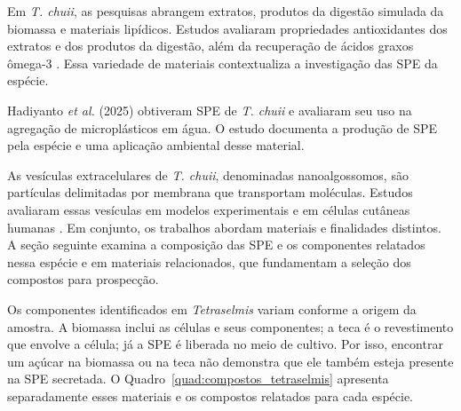 Em \textit{T. chuii}, as pesquisas abrangem extratos, produtos da digestão simulada da biomassa e materiais lipídicos. Estudos avaliaram propriedades antioxidantes dos extratos e dos produtos da digestão, além da recuperação de ácidos graxos ômega-3 \parencite{cokdinleyen2024,moon2023,paterson2024}. Essa variedade de materiais contextualiza a investigação das SPE da espécie.

Hadiyanto \textit{et al.} (2025) obtiveram SPE de \textit{T. chuii} e avaliaram seu uso na agregação de microplásticos em água. O estudo documenta a produção de SPE pela espécie e uma aplicação ambiental desse material.

As vesículas extracelulares de \textit{T. chuii}, denominadas nanoalgossomos, são partículas delimitadas por membrana que transportam moléculas. Estudos avaliaram essas vesículas em modelos experimentais e em células cutâneas humanas \parencite{adamo2024,gargano2026}. Em conjunto, os trabalhos abordam materiais e finalidades distintos. A seção seguinte examina a composição das SPE e os componentes relatados nessa espécie e em materiais relacionados, que fundamentam a seleção dos compostos para prospecção.

Os componentes identificados em \textit{Tetraselmis} variam conforme a origem da amostra. A biomassa inclui as células e seus componentes; a teca é o revestimento que envolve a célula; já a SPE é liberada no meio de cultivo. Por isso, encontrar um açúcar na biomassa ou na teca não demonstra que ele também esteja presente na SPE secretada. O Quadro~\ref{quad:compostos_tetraselmis} apresenta separadamente esses materiais e os compostos relatados para cada espécie.

